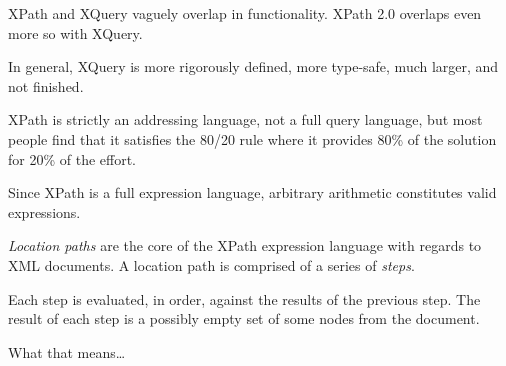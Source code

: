 \documentclass[20pt,landscape,headrule,footrule]{foils}
\begin{document}


XPath and XQuery vaguely overlap in functionality.  XPath 2.0 overlaps
even more so with XQuery.

In general, XQuery is more rigorously defined, more type-safe, much
larger, and not finished.

XPath is strictly an addressing language, not a full query language,
but most people find that it satisfies the 80/20 rule where it
provides 80\% of the solution for 20\% of the effort.





Since XPath is a full expression language, arbitrary arithmetic
constitutes valid expressions.






\emph{Location paths} are the core of the XPath expression
language with regards to XML documents.  A location path is comprised
of a series of \emph{steps}.

Each step is evaluated, in order, against the results of the previous
step.  The result of each step is a possibly empty set of some nodes
from the document.


What that means\dots


\end{document}
